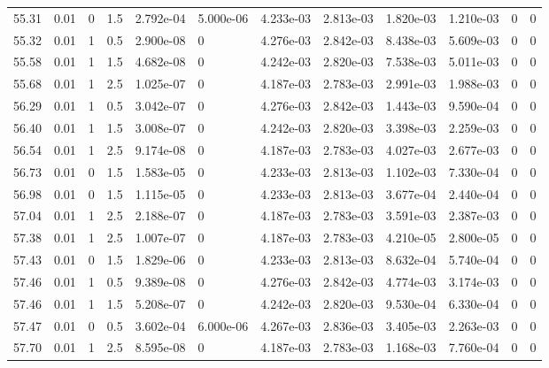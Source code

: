 \documentclass[preview]{standalone}
\begin{document}
{{{{{{{{\begin{tabular}{L{1.2cm}C{1.2cm} C{0.3cm}C{0.5cm} C{1.4cm}C{1.4cm} C{1.4cm}C{1.4cm} C{1.6cm}C{1.6cm} C{1.6cm}C{1.6cm}}
  55.31  &  0.01  & 0     & 1.5 &  2.792e-04  & 5.000e-06  &  4.233e-03&   2.813e-03& 1.820e-03 & 1.210e-03   &  0 & 0  \\ 
  55.32  &  0.01  & 1     & 0.5 &  2.900e-08  & 0  &  4.276e-03&   2.842e-03& 8.438e-03 & 5.609e-03   &  0 & 0  \\ 
  55.58  &  0.01  & 1     & 1.5 &  4.682e-08  & 0  &  4.242e-03&   2.820e-03& 7.538e-03 & 5.011e-03   &  0 & 0  \\ 
  55.68  &  0.01  & 1     & 2.5 &  1.025e-07  & 0  &  4.187e-03&   2.783e-03& 2.991e-03 & 1.988e-03   &  0 & 0  \\ 
  56.29  &  0.01  & 1     & 0.5 &  3.042e-07  & 0  &  4.276e-03&   2.842e-03& 1.443e-03 & 9.590e-04   &  0 & 0  \\ 
  56.40  &  0.01  & 1     & 1.5 &  3.008e-07  & 0  &  4.242e-03&   2.820e-03& 3.398e-03 & 2.259e-03   &  0 & 0  \\ 
  56.54  &  0.01  & 1     & 2.5 &  9.174e-08  & 0  &  4.187e-03&   2.783e-03& 4.027e-03 & 2.677e-03   &  0 & 0  \\ 
  56.73  &  0.01  & 0     & 1.5 &  1.583e-05  & 0  &  4.233e-03&   2.813e-03& 1.102e-03 & 7.330e-04   &  0 & 0  \\ 
  56.98  &  0.01  & 0     & 1.5 &  1.115e-05  & 0  &  4.233e-03&   2.813e-03& 3.677e-04 & 2.440e-04   &  0 & 0  \\ 
  57.04  &  0.01  & 1     & 2.5 &  2.188e-07  & 0  &  4.187e-03&   2.783e-03& 3.591e-03 & 2.387e-03   &  0 & 0  \\ 
  57.38  &  0.01  & 1     & 2.5 &  1.007e-07  & 0  &  4.187e-03&   2.783e-03& 4.210e-05 & 2.800e-05   &  0 & 0  \\ 
  57.43  &  0.01  & 0     & 1.5 &  1.829e-06  & 0  &  4.233e-03&   2.813e-03& 8.632e-04 & 5.740e-04   &  0 & 0  \\ 
  57.46  &  0.01  & 1     & 0.5 &  9.389e-08  & 0  &  4.276e-03&   2.842e-03& 4.774e-03 & 3.174e-03   &  0 & 0  \\ 
  57.46  &  0.01  & 1     & 1.5 &  5.208e-07  & 0  &  4.242e-03&   2.820e-03& 9.530e-04 & 6.330e-04   &  0 & 0  \\ 
  57.47  &  0.01  & 0     & 0.5 &  3.602e-04  & 6.000e-06  &  4.267e-03&   2.836e-03& 3.405e-03 & 2.263e-03   &  0 & 0  \\ 
  57.70  &  0.01  & 1     & 2.5 &  8.595e-08  & 0  &  4.187e-03&   2.783e-03& 1.168e-03 & 7.760e-04   &  0 & 0  \\ 
\hline 
\end{tabular} 

}}}}}}}}
\end{document}
